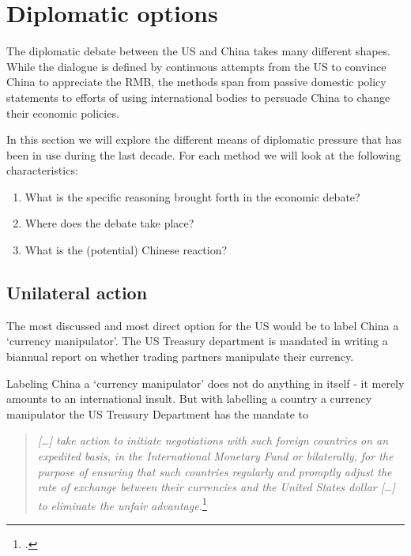 \section{Diplomatic options}
\label{sec:diplomacy}


The diplomatic debate between the US and China takes many different 
shapes. While the dialogue is defined by continuous attempts from the US 
to convince China to appreciate the RMB, the methods span from passive 
domestic policy statements to efforts of using international bodies to 
persuade China to change their economic policies.

In this section we will explore the different means of diplomatic 
pressure that has been in use during the last decade. For each method we 
will look at the following characteristics:

\begin{enumerate}
	\item{What is the specific reasoning brought 
		forth in the economic debate?}
	\item{Where does the debate take 
		place?}
	\item{What is the (potential) Chinese reaction?}
\end{enumerate}



\subsection{Unilateral action}

The most discussed and most direct option for the US would be to label China a `currency manipulator'. The US Treasury department is mandated in writing a biannual report on whether trading partners manipulate their currency.  

Labeling China a `currency manipulator' does not do anything in itself - 
it merely amounts to an international insult. But with labelling a 
country a currency manipulator the US Treasury Department has the 
mandate to
\begin{quotation}
\emph{[\dots] take action to initiate negotiations with such foreign 
	countries on an expedited basis, in the International Monetary Fund 
	or bilaterally, for the purpose of ensuring that such countries 
	regularly and promptly adjust the rate of exchange between their 
	currencies and the United States dollar [\dots] to eliminate the 
unfair advantage.}\footnote{\cite{TradeAct1988}.}
\end{quotation}



